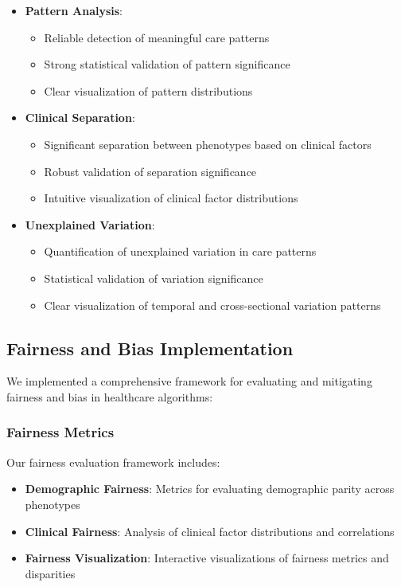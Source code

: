 \documentclass[12pt]{article}
\begin{document}
\begin{itemize}
    \item \textbf{Pattern Analysis}:
    \begin{itemize}
        \item Reliable detection of meaningful care patterns
        \item Strong statistical validation of pattern significance
        \item Clear visualization of pattern distributions
    \end{itemize}
    
    \item \textbf{Clinical Separation}:
    \begin{itemize}
        \item Significant separation between phenotypes based on clinical factors
        \item Robust validation of separation significance
        \item Intuitive visualization of clinical factor distributions
    \end{itemize}
    
    \item \textbf{Unexplained Variation}:
    \begin{itemize}
        \item Quantification of unexplained variation in care patterns
        \item Statistical validation of variation significance
        \item Clear visualization of temporal and cross-sectional variation patterns
    \end{itemize}
\end{itemize}

\subsection{Fairness and Bias Implementation}

We implemented a comprehensive framework for evaluating and mitigating fairness and bias in healthcare algorithms:

\subsubsection{Fairness Metrics}

Our fairness evaluation framework includes:
\begin{itemize}
    \item \textbf{Demographic Fairness}: Metrics for evaluating demographic parity across phenotypes
    \item \textbf{Clinical Fairness}: Analysis of clinical factor distributions and correlations
    \item \textbf{Fairness Visualization}: Interactive visualizations of fairness metrics and disparities
\end{itemize}
\end{document}
